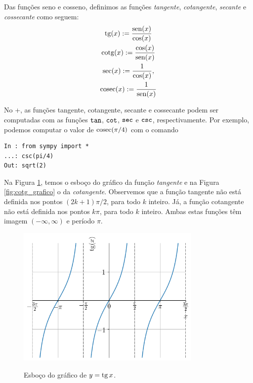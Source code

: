 Das funções seno e cosseno, definimos as funções \emph{tangente}, \emph{cotangente}, \emph{secante} e \emph{cossecante} como seguem:
\begin{gather}
  \operatorname{tg}(x) := \frac{\operatorname{sen}(x)}{\cos(x)}\\
  \operatorname{cotg}(x) := \frac{\cos(x)}{\operatorname{sen}(x)}\\
  \sec(x) := \frac{1}{\cos(x)},\\
  \operatorname{cosec}(x) := \frac{1}{\operatorname{sen}(x)}
\end{gather}

\ifispython
No {\python}+{\sympy}, as funções tangente, cotangente, secante e cossecante podem ser computadas com as funções $\verb+tan+$, $\verb+cot+$, $\verb+sec+$ e $\verb+csc+$, respectivamente. Por exemplo, podemos computar o valor de $\operatorname{cosec}(\pi/4)$ com o comando
\begin{lstlisting}
In : from sympy import *
...: csc(pi/4)
Out: sqrt(2)
\end{lstlisting}
\fi

Na Figura \ref{fig:tg_grafico}, temos o esboço do gráfico da função \emph{tangente} e na Figura \ref{fig:cotg_grafico} o da \emph{cotangente}. Observemos que a função tangente não está definida nos pontos $(2k+1)\pi/2$, para todo $k$ inteiro. Já, a função cotangente não está definida nos pontos $k\pi$, para todo $k$ inteiro. Ambas estas funções têm imagem $(-\infty, \infty)$ e período $\pi$.

\begin{figure}[H]
  \centering
  \includegraphics[width=0.8\textwidth]{./cap_funcao/dados/fig_co_tg_graficos/fig_tg_grafico}\\
  \caption{Esboço do gráfico de $y=\operatorname{tg} x$.}
  \label{fig:tg_grafico}
\end{figure}

